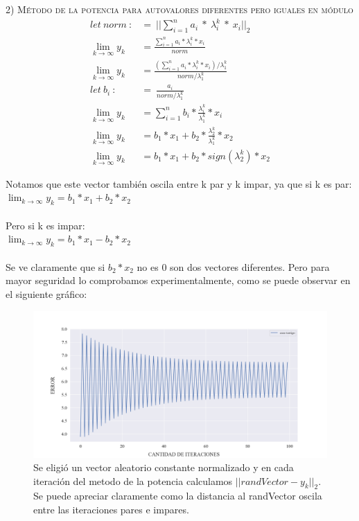 \noindent \textsc{2) Método de la potencia para autovalores diferentes pero iguales en módulo}
\begin{align}
    let \ norm \ :&= \ ||\sum_{i=1}^{n} a_i \ * \ \lambda_{i}^{k} \ * \ x_i||_2 \\
    \lim_{k \to \infty} y_k &= \frac{\sum_{i=1}^{n} a_i * \lambda_{i}^{k} * x_i }{norm} \\ 
    \lim_{k \to \infty} y_k &= \frac{(\sum_{i=1}^{n} a_i * \lambda_{i}^{k} * x_i) / \lambda_{1}^{k}}{norm / \lambda_{1}^{k}} \\
    let \ b_i \ :&= \ \frac{a_i}{norm / \lambda_{1}^{k}} \\
    \lim_{k \to \infty} y_k &= \sum_{i=1}^{n} b_i * \frac{\lambda_{i}^{k}}{\lambda_{1}^{k}} * x_i \\
    \lim_{k \to \infty} y_k &= b_1 * x_1 + b_2 * \frac{\lambda_{2}^{k}}{\lambda_{1}^{k}} * x_2 \\
    \lim_{k \to \infty} y_k &= b_1 * x_1 + b_2 * sign(\lambda_{2}^{k}) * x_2 
\end{align}

\vspace{1em}

\noindent Notamos que este vector también oscila entre k par y k impar, ya que si k es par: \\
\indent\indent $\lim_{k \to \infty} y_k = b_1 * x_1 + b_2 * x_2$ \\ \\
Pero si k es impar: \\
\indent \indent $\lim_{k \to \infty} y_k = b_1 * x_1 - b_2 * x_2$ \\ \\
Se ve claramente que si $b_2 * x_2$ no es 0 son dos vectores diferentes.
Pero para mayor seguridad lo comprobamos experimentalmente, como se puede observar en el siguiente gráfico:

\vspace{1em}
\begin{figure}[!htbp]
\includegraphics[scale=0.55, trim=100 80 100 100, clip]{files/src/.media/op_oscilante.png}
\caption{Se eligió un vector aleatorio constante normalizado y en cada iteración del metodo de la potencia calculamos $||randVector - y_k||_2$. Se puede apreciar claramente como la distancia al randVector oscila entre las iteraciones pares e impares.}
\end{figure}


